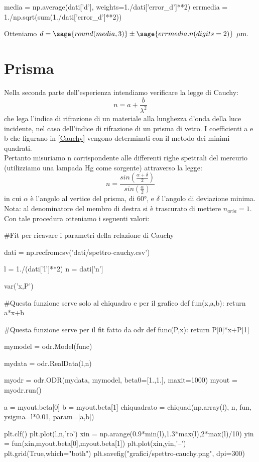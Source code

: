 \begin{sagesilent}
media = np.average(dati['d'], weights=1./dati['error_d']**2)
errmedia = 1./np.sqrt(sum(1./dati['error_d']**2))
\end{sagesilent}

Otteniamo $d=\sage{round(media, 3)}\pm\sage{errmedia.n(digits=2)}$ $\mu$m.




\section*{Prisma}


Nella seconda parte dell'esperienza intendiamo verificare la legge di Cauchy:
\begin{equation}
n = a + \frac{b}{\lambda^2}
\label{Cauchy}
\end{equation}
che lega l'indice di rifrazione di un materiale alla lunghezza d'onda della luce incidente, nel caso dell'indice di rifrazione di un prisma di vetro.
I coefficienti a e b che figurano in \ref{Cauchy} vengono determinati con il metodo dei minimi quadrati. \\
Pertanto misuriamo n corrispondente alle differenti righe spettrali del mercurio (utilizziamo una lampada Hg come sorgente) attraverso la legge:
\begin{equation}
n = \frac{sin(\frac{\alpha + \delta}{2})}{sin(\frac{\alpha}{2})}
\label{n}
\end{equation}
in cui $\alpha$ è l'angolo al vertice del prisma, di $60°$, e $\delta$ l'angolo di deviazione minima. Nota: al denominatore del membro di destra si è trascurato di mettere $n_{aria}=1$.\\

Con tale procedura otteniamo i seguenti valori:

\begin{sagesilent}

 #Fit per ricavare i parametri della relazione di Cauchy


dati = np.recfromcsv('dati/spettro-cauchy.csv')

l = 1./(dati['l']**2)
n = dati['n']

var('x,P')

#Questa funzione serve solo al chiquadro e per il grafico
def fun(x,a,b):
    return a*x+b


#Questa funzione serve per il fit fatto da odr
def func(P,x):
    return P[0]*x+P[1]
    
mymodel = odr.Model(func)

mydata = odr.RealData(l,n)

myodr = odr.ODR(mydata, mymodel, beta0=[1.,1.], maxit=1000)
myout = myodr.run()

a = myout.beta[0]
b = myout.beta[1]
chiquadrato = chiquad(np.array(l), n, fun, ysigma=l*0.01, param=[a,b]) 

   
plt.clf()
plt.plot(l,n,'ro')
xin = np.arange(0.9*min(l),1.3*max(l),2*max(l)/10) 
yin = fun(xin,myout.beta[0],myout.beta[1])
plt.plot(xin,yin,'--')
plt.grid(True,which="both")
plt.savefig("grafici/spettro-cauchy.png", dpi=300)
 

\end{sagesilent}


